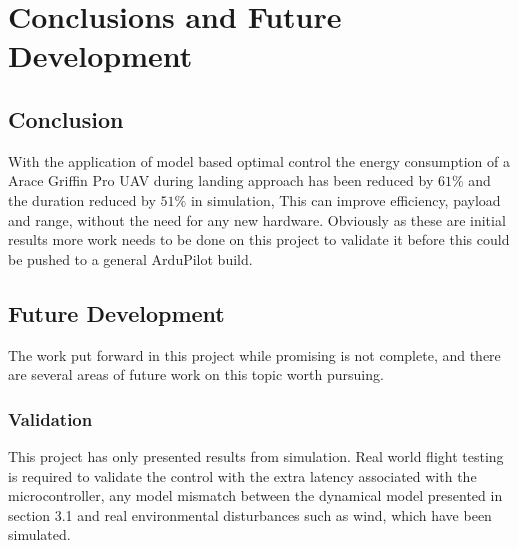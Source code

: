 \chapter{Conclusions and Future Development}
\vspace{-1.4em}

\section{Conclusion}
With the application of model based optimal control the energy consumption of a Arace Griffin Pro UAV during landing approach has been reduced by $61\%$ and the duration reduced by $51\%$ in simulation, This can improve efficiency, payload and range, without the need for any new hardware. Obviously as these are initial results more work needs to be done on this project to validate it before this could be pushed to a general ArduPilot build.

\section{Future Development}
The work put forward in this project while promising is not complete, and there are several areas of future work on this topic worth pursuing.

\subsection{Validation}
This project has only presented results from simulation. Real world flight testing is required to validate the control with the extra latency associated with the microcontroller, any model mismatch between the dynamical model presented in section 3.1 and real environmental disturbances such as wind, which have been simulated.

